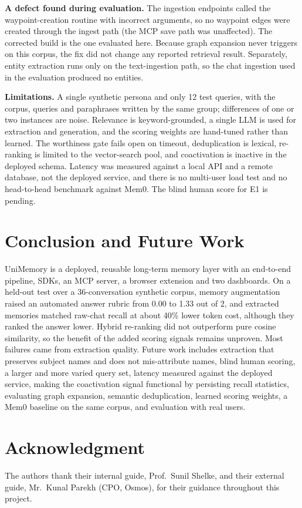 \documentclass[conference]{IEEEtran}
\begin{document}
\textbf{A defect found during evaluation.} The ingestion endpoints called the
waypoint-creation routine with incorrect arguments, so no waypoint edges were
created through the ingest path (the MCP save path was unaffected). The corrected
build is the one evaluated here. Because graph expansion never triggers on this
corpus, the fix did not change any reported retrieval result. Separately, entity
extraction runs only on the text-ingestion path, so the chat ingestion used in
the evaluation produced no entities.

\textbf{Limitations.} A single synthetic persona and only 12 test queries, with
the corpus, queries and paraphrases written by the same group; differences of one
or two instances are noise. Relevance is keyword-grounded, a single LLM is used
for extraction and generation, and the scoring weights are hand-tuned rather than
learned. The worthiness gate fails open on timeout, deduplication is lexical,
re-ranking is limited to the vector-search pool, and coactivation is inactive in
the deployed schema. Latency was measured against a local API and a remote
database, not the deployed service, and there is no multi-user load test and no
head-to-head benchmark against Mem0. The blind human score for E1 is pending.

\section{Conclusion and Future Work}\label{sec:conclusion}
UniMemory is a deployed, reusable long-term memory layer with an end-to-end
pipeline, SDKs, an MCP server, a browser extension and two dashboards. On a
held-out test over a 36-conversation synthetic corpus, memory augmentation raised
an automated answer rubric from 0.00 to 1.33 out of 2, and extracted memories
matched raw-chat recall at about 40\% lower token cost, although they ranked the
answer lower. Hybrid re-ranking did not outperform pure cosine similarity, so the
benefit of the added scoring signals remains unproven. Most failures came from
extraction quality. Future work includes extraction that preserves subject names
and does not mis-attribute names, blind human scoring, a larger and more varied
query set, latency measured against the deployed service, making the coactivation
signal functional by persisting recall statistics, evaluating graph expansion,
semantic deduplication, learned scoring weights, a Mem0 baseline on the same
corpus, and evaluation with real users.

\section*{Acknowledgment}
The authors thank their internal guide, Prof.\ Sunil Shelke, and their external
guide, Mr.\ Kunal Parekh (CPO, Osmos), for their guidance throughout this
project.



\end{document}
